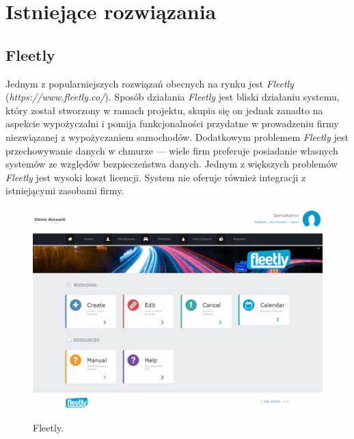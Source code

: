 \documentclass[eng,printmode,openany]{mgr}
\begin{document}
	\newpage
	\chapter{Istniejące rozwiązania}

	\section{Fleetly}
	Jednym z popularniejszych rozwiązań obecnych na rynku jest \textit{Fleetly} (\textit{https://www.fleetly.co/}). Sposób działania \textit{Fleetly} jest bliski działaniu systemu, który został stworzony w ramach projektu, skupia się on jednak zanadto na aspekcie wypożyczalni i pomija funkcjonalności przydatne w prowadzeniu firmy niezwiązanej z wypożyczaniem samochodów. Dodatkowym problemem \textit{Fleetly} jest przechowywanie danych w chmurze — wiele firm preferuje posiadanie własnych systemów ze względów bezpieczeństwa danych. Jednym z większych problemów \textit{Fleetly} jest wysoki koszt licencji. System nie oferuje również integracji z istniejącymi zasobami firmy.
	\begin{figure}[H]
		\centering
		\includegraphics[width=\textwidth]{images/fleetly.png}
		\caption{Fleetly.}
	\end{figure}
	
\end{document}
